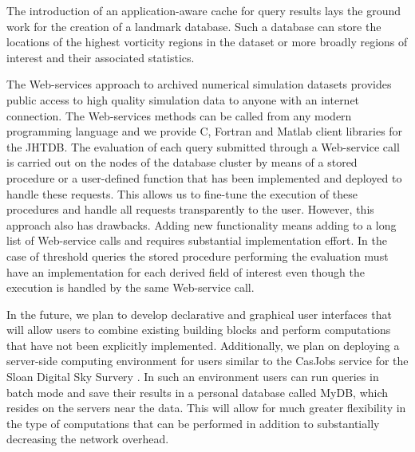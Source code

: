 \documentclass{sig-alternate}
\begin{document}
The introduction of an application-aware cache for query results lays the ground work for the creation of a landmark database. Such a database can store the 
locations of the highest vorticity regions in the dataset or more broadly regions of interest and their associated statistics.

The Web-services approach to archived numerical simulation datasets provides public access to high quality simulation data to anyone with an internet
connection. The Web-services methods can be called from any modern programming language and we provide C, Fortran and Matlab client libraries for the
JHTDB. The evaluation of each query submitted through a Web-service call is carried out on the nodes of the database cluster by means of a stored
procedure
or a user-defined function that has been implemented and deployed to handle these requests. This allows us to fine-tune the execution of these procedures
and handle all requests transparently to the user. However, this approach also has drawbacks. Adding new functionality means adding to a long list of 
Web-service calls and requires substantial implementation effort. In the case of threshold queries the stored procedure performing the evaluation must have
an implementation for each derived field of interest even though the execution is handled by the same Web-service call. 

In the future, we plan to develop
declarative and graphical user interfaces that will allow users to combine existing building blocks and perform computations that have not been explicitly
implemented. Additionally, we plan on deploying a server-side computing environment for users similar to the CasJobs service for the Sloan Digital Sky Survery \cite{LiThakar}. In such an environment users can run queries in batch mode and save their results in a personal database called MyDB, which 
resides on the servers near the data.
This will allow for much greater flexibility in the type of computations that can be performed in addition to substantially decreasing the network overhead.




 
\end{document}
